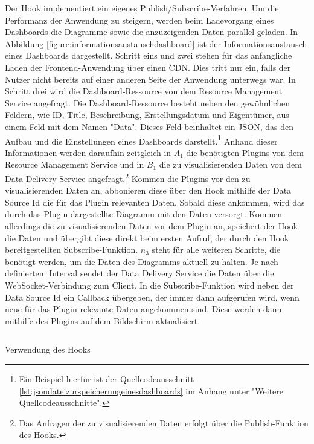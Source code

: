 Der  Hook implementiert ein eigenes Publish/Subscribe-Verfahren.
Um die Performanz der Anwendung zu steigern, werden beim Ladevorgang eines Dashboards
die Diagramme sowie die anzuzeigenden Daten parallel geladen. In Abbildung \ref{figure:informationsaustauschdashboard}
ist der Informationsaustausch eines Dashboards dargestellt. Schritt eins und zwei stehen
für das anfangliche Laden der Frontend-Anwendung über einen CDN. Dies tritt nur ein,
falls der Nutzer nicht bereits auf einer anderen Seite der Anwendung unterwegs war.
In Schritt drei wird die Dashboard-Ressource von dem Resource Management Service angefragt.
Die Dashboard-Ressource besteht neben den gewöhnlichen Feldern, wie ID, Title, Beschreibung,
Erstellungsdatum und Eigentümer, aus einem Feld mit dem Namen "Data". Dieses Feld beinhaltet
ein JSON, das den Aufbau und die Einstellungen eines Dashboards darstellt.\footnote{Ein
Beispiel hierfür ist der Quellcodeausschnitt \ref{lst:jsondateizurspeicherungeinesdashboards}
im Anhang unter "Weitere Quellcodeausschnitte".} Anhand dieser Informationen werden
daraufhin zeitgleich in \( A_1 \) die benötigten Plugins von dem Resource Management Service
und in \( B_1 \) die zu visualisierenden Daten von dem Data Delivery Service angefragt.\footnote{Das Anfragen
der zu visualisierenden Daten erfolgt über die Publish-Funktion des 
 Hooks.}
Kommen die Plugins vor den zu visualisierenden Daten an, abbonieren diese über 
den  Hook mithilfe der Data Source Id die für das Plugin relevanten
Daten. Sobald diese ankommen, wird das durch das Plugin dargestellte Diagramm mit
den Daten versorgt. Kommen allerdings die zu visualisierenden Daten vor dem Plugin an,
speichert der  Hook die Daten und übergibt diese direkt beim
ersten Aufruf, der durch den  Hook bereitgestellten
Subscribe-Funktion. \( n_3 \) steht für alle weiteren Schritte, die benötigt werden,
um die Daten des Diagramms aktuell zu halten. Je nach definiertem Interval sendet
der Data Delivery Service die Daten über die WebSocket-Verbindung zum Client.
In die Subscribe-Funktion wird neben der Data Source Id ein Callback übergeben,
der immer dann aufgerufen wird, wenn neue für das Plugin relevante Daten angekommen sind.
Diese werden dann mithilfe des Plugins auf dem Bildschirm aktualisiert.

\begin{listing}
    \inputminted{jsx}{snippets/jsx/useModalBeispiel.jsx}
    \caption{Verwendung des  Hooks}
    \label{lst:verwendungdesusemodalhooks}
\end{listing}

